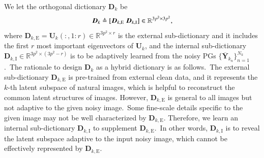 We let the orthogonal dictionary $\bm{D}_{k}$ be 
\vspace{-2mm}
\begin{equation}
\vspace{-2mm}
\label{equ3-4}
\bm{D}_{k}\triangleq[\bm{D}_{k,\text{E}}\ \bm{D}_{k,\text{I}}]\in \mathbb{R}^{3p^2\times 3p^2},
\end{equation}
where $\bm{D}_{k,\text{E}}=\bm{U}_{k}(:,1:r)\in\mathbb{R}^{3p^2\times r}$ is the external sub-dictionary and it includes the first $r$ most important eigenvectors of $\bm{U}_{k}$, and the internal sub-dictionary $\bm{D}_{k,\text{I}}\in\mathbb{R}^{3p^2\times (3p^2-r)}$ is to be adaptively learned from the noisy PGs $\{\bm{\overline{Y}}_{k_{n}}\}_{n=1}^{N_{k}}$.\ The rationale to design $\bm{D}_{k}$ as a hybrid dictionary is as follows.\ The external sub-dictionary $\bm{D}_{k,\text{E}}$ is pre-trained from external clean data, and it represents the $k$-th latent subspace of natural images, which is helpful to reconstruct the common latent structures of images. However, $\bm{D}_{k,\text{E}}$ is general to all images but not adaptive to the given noisy image.\ Some fine-scale details specific to the given image may not be well characterized by $\bm{D}_{k,\text{E}}$. Therefore, we learn an internal sub-dictionary $\bm{D}_{k,\text{I}}$ to supplement $\bm{D}_{k,\text{E}}$.\ In other words, $\bm{D}_{k,\text{I}}$ is to reveal the latent subspace adaptive to the input noisy image, which cannot be effectively represented by $\bm{D}_{k,\text{E}}$. 

